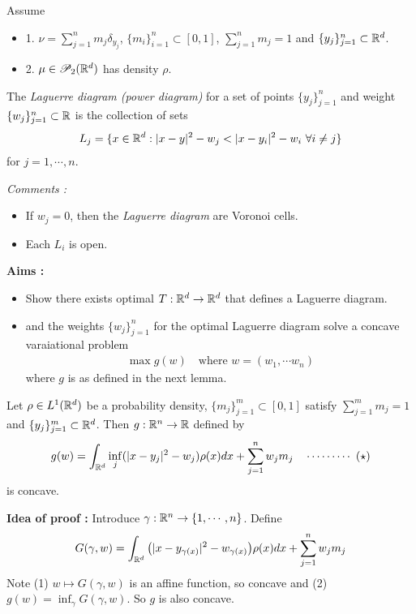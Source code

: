 \documentclass[12pt,a4paper]{article}
\newenvironment{proof}
{\begin{changemargin}{1cm}{0.5cm} 
	}%
	{\end{changemargin}
}
\renewenvironment{i}
{\begin{itemize} 
	}%
	{\end{itemize}
}
\newenvironment{p}
{\begin{proof} 
	}%
	{\end{proof}
}
\begin{document}
Assume
\begin{i}
\item[1.] $\nu = \sum_{j=1}^n m_{j} \delta_{y_j}$, $\{m_i\}_{i=1}^n \subset [0,1]$, $\sum_{j=1}^n m_j =1$ and $\{y_j \}_{j=1}^n \subset \mathbb{R}^d$.
\item[2.] $\mu \in \mathscr{P}_2(\mathbb{R}^d)$ has density $\rho$.  
\end{i}
\s

 The \emph{Laguerre diagram (power diagram)} for a set of points $\{y_j\}_{j=1}^n$ and weight $\{w_j\}_{j=1}^n\subset \mathbb{R}$ is the collection of sets
\begin{align*}
L_j = \{x\in \mathbb{R}^d : |x-y|^2 - w_j < |x-y_i|^2 - w_i \,\, \forall i\neq j\}
\end{align*}
for $j=1, \cdots, n$.
\s

\emph{Comments :}
\begin{i}
\item If $w_j =0$, then the \emph{Laguerre diagram} are Voronoi cells.
\item Each $L_i$ is open.
\end{i}
\s

\textbf{Aims :}
\begin{i}
\item Show there exists optimal $T: \mathbb{R}^d \rightarrow \mathbb{R}^d$ that defines a Laguerre diagram.
\item and the weights $\{w_j\}_{j=1}^n$ for the optimal Laguerre diagram solve a concave varaiational problem
\begin{align*}
\max g(w) \quad \text{where } w= (w_1, \cdots w_n)
\end{align*} 
where $g$ is as defined in the next lemma.
\end{i}
\s

 Let $\rho \in L^1(\mathbb{R}^d)$ be a probability density, $\{m_j \}_{j=1}^m \subset [0,1]$ satisfy $\sum_{j=1}^m m_j =1$ and $\{y_j \}_{j=1}^m \subset \mathbb{R}^d$. Then $g: \mathbb{R}^n \rightarrow \mathbb{R}$ defined by 
\begin{align*}
g(w) = \int_{\mathbb{R}^d} \inf_j (|x-y_j|^2 - w_j) \rho(x) dx + \sum_{j=1}^n w_j m_j \quad \cdots\cdots\cdots\,\,(\star)
\end{align*}
is concave.
\begin{p}
\textbf{Idea of proof :} Introduce $\gamma : \mathbb{R}^n \rightarrow \{1, \cdots, n \}$. Define
\begin{align*}
G(\gamma, w) = \int_{\mathbb{R}^d} \big( |x-y_{\gamma(x)}|^2 - w_{\gamma(x)}\big) \rho(x) dx + \sum_{j=1}^n w_j m_j
\end{align*}
Note (1) $w\mapsto G(\gamma, w)$ is an affine function, so concave and (2) $g(w) = \inf_{\gamma} G(\gamma, w)$. So $g$ is also concave.
\end{p}
\s
\end{document}
